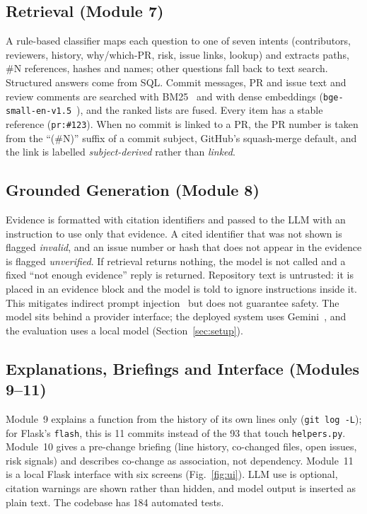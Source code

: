 \documentclass[conference]{IEEEtran}
\newcommand{\res}[1]{#1}
\newcommand{\code}[1]{\texttt{\small #1}}
\begin{document}
\subsection{Retrieval (Module 7)}
A rule-based classifier maps each question to one of seven intents (contributors, reviewers, history, why/which-PR, risk, issue links, lookup) and extracts paths, \#N references, hashes and names; other questions fall back to text search. Structured answers come from SQL. Commit messages, PR and issue text and review comments are searched with BM25~\cite{robertson2009bm25} and with dense embeddings (\code{bge-small-en-v1.5}~\cite{xiao2023cpack}), and the ranked lists are fused. Every item has a stable reference (\code{pr:\#123}). When no commit is linked to a PR, the PR number is taken from the ``(\#N)'' suffix of a commit subject, GitHub's squash-merge default, and the link is labelled \emph{subject-derived} rather than \emph{linked}.

\subsection{Grounded Generation (Module 8)}
Evidence is formatted with citation identifiers and passed to the LLM with an instruction to use only that evidence. A cited identifier that was not shown is flagged \emph{invalid}, and an issue number or hash that does not appear in the evidence is flagged \emph{unverified}. If retrieval returns nothing, the model is not called and a fixed ``not enough evidence'' reply is returned. Repository text is untrusted: it is placed in an evidence block and the model is told to ignore instructions inside it. This mitigates indirect prompt injection~\cite{greshake2023injection} but does not guarantee safety. The model sits behind a provider interface; the deployed system uses Gemini~\cite{gemini2023}, and the evaluation uses a local model (Section~\ref{sec:setup}).

\subsection{Explanations, Briefings and Interface (Modules 9--11)}
Module~9 explains a function from the history of its own lines only (\code{git log -L}); for Flask's \code{flash}, this is 11 commits instead of the 93 that touch \code{helpers.py}. Module~10 gives a pre-change briefing (line history, co-changed files, open issues, risk signals) and describes co-change as association, not dependency. Module~11 is a local Flask interface with six screens (Fig.~\ref{fig:ui}). LLM use is optional, citation warnings are shown rather than hidden, and model output is inserted as plain text. The codebase has \res{184} automated tests.
\end{document}
